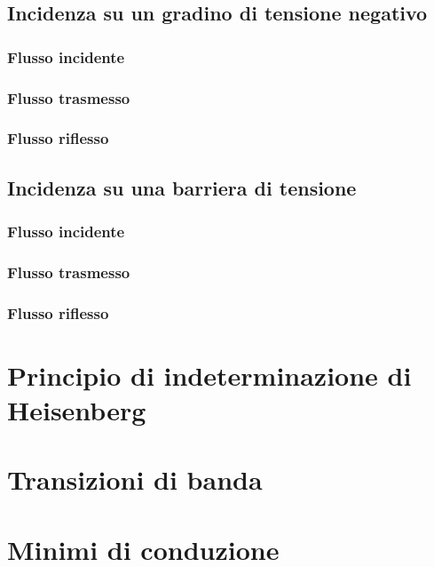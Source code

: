 \documentclass[10pt,a4paper]{report}
\begin{document}
	
	\section{Incidenza su un gradino di tensione negativo}


		\subsection{Flusso incidente}

		\subsection{Flusso trasmesso}

		\subsection{Flusso riflesso}

	\section{Incidenza su una barriera di tensione}

		\subsection{Flusso incidente}

		\subsection{Flusso trasmesso}

		\subsection{Flusso riflesso}


\chapter{Principio di indeterminazione di Heisenberg}

\chapter{Transizioni di banda}

\chapter{Minimi di conduzione}
\end{document}
